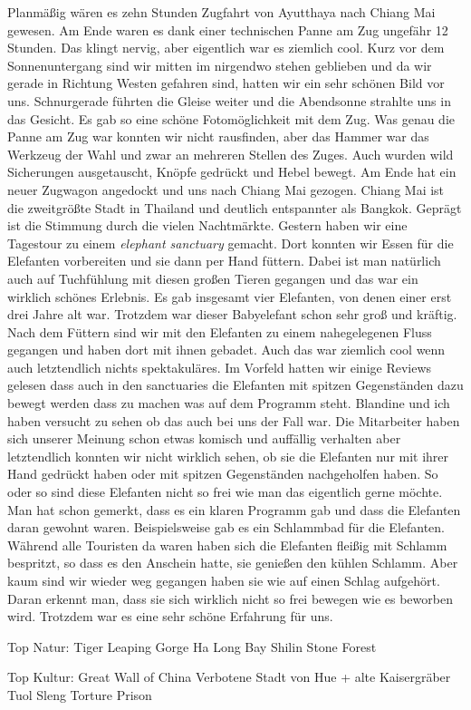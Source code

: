 \documentclass[11pt]{book}
\begin{document}
Planmäßig wären es zehn Stunden Zugfahrt von Ayutthaya nach Chiang Mai gewesen. Am Ende waren es dank einer technischen Panne am 
Zug ungefähr 12 Stunden. Das klingt nervig, aber eigentlich war es ziemlich cool. Kurz vor dem Sonnenuntergang sind wir mitten im 
nirgendwo stehen geblieben und da wir gerade in Richtung Westen gefahren sind, hatten wir ein sehr schönen Bild vor uns. Schnurgerade
führten die Gleise weiter und die Abendsonne strahlte uns in das Gesicht. Es gab so eine schöne Fotomöglichkeit mit dem Zug. Was 
genau die Panne am Zug war konnten wir nicht rausfinden, aber das Hammer war das Werkzeug der Wahl und zwar an mehreren Stellen
des Zuges. Auch wurden wild Sicherungen ausgetauscht, Knöpfe gedrückt und Hebel bewegt. Am Ende hat ein neuer Zugwagon angedockt 
und uns nach Chiang Mai gezogen. 
Chiang Mai ist die zweitgrößte Stadt in Thailand und deutlich entspannter als Bangkok. Geprägt ist die Stimmung durch die vielen 
Nachtmärkte. Gestern haben wir eine Tagestour zu einem \emph{elephant sanctuary} gemacht. Dort konnten wir Essen für die Elefanten 
vorbereiten und sie dann per Hand füttern. Dabei ist man natürlich auch auf Tuchfühlung mit diesen großen Tieren gegangen und das 
war ein wirklich schönes Erlebnis. Es gab insgesamt vier Elefanten, von denen einer erst drei Jahre alt war. Trotzdem war dieser 
Babyelefant schon sehr groß und kräftig. Nach dem Füttern sind wir mit den Elefanten zu einem nahegelegenen Fluss gegangen und haben 
dort mit ihnen gebadet. Auch das war ziemlich cool wenn auch letztendlich nichts spektakuläres. Im Vorfeld hatten wir einige Reviews 
gelesen dass auch in den sanctuaries die Elefanten mit spitzen Gegenständen dazu bewegt werden dass zu machen was auf dem Programm 
steht. Blandine und ich haben versucht zu sehen ob das auch bei uns der Fall war. Die Mitarbeiter haben sich unserer Meinung schon 
etwas komisch und auffällig verhalten aber letztendlich konnten wir nicht wirklich sehen, ob sie die Elefanten nur mit ihrer Hand 
gedrückt haben oder mit spitzen Gegenständen nachgeholfen haben. So oder so sind diese Elefanten nicht so frei wie man das eigentlich 
gerne möchte. Man hat schon gemerkt, dass es ein klaren Programm gab und dass die Elefanten daran gewohnt waren. Beispielsweise 
gab es ein Schlammbad für die Elefanten. Während alle Touristen da waren haben sich die Elefanten fleißig mit Schlamm bespritzt, so dass 
es den Anschein hatte, sie genießen den kühlen Schlamm. Aber kaum sind wir wieder weg gegangen haben sie wie auf einen Schlag 
aufgehört. Daran erkennt man, dass sie sich wirklich nicht so frei bewegen wie es beworben wird. Trotzdem war es eine sehr schöne 
Erfahrung für uns. 


Top Natur:
Tiger Leaping Gorge
Ha Long Bay
Shilin Stone Forest

Top Kultur:
Great Wall of China
Verbotene Stadt von Hue + alte Kaisergräber 
Tuol Sleng Torture Prison
\end{document}

